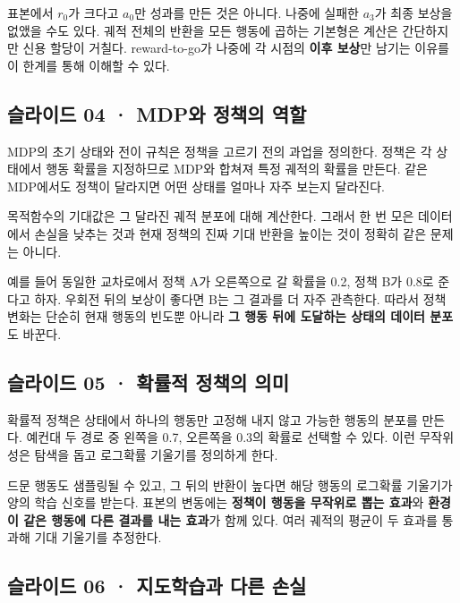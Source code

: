 \documentclass[11pt,a4paper]{article}
\begin{document}
표본에서 $r_0$가 크다고 $a_0$만 성과를 만든 것은 아니다. 나중에 실패한 $a_3$가 최종 보상을 없앴을 수도 있다. 궤적 전체의 반환을 모든 행동에 곱하는 기본형은 계산은 간단하지만 신용 할당이 거칠다. reward-to-go가 나중에 각 시점의 \textbf{이후 보상}만 남기는 이유를 이 한계를 통해 이해할 수 있다.\par

\subsection{슬라이드 04 · MDP와 정책의 역할}

MDP의 초기 상태와 전이 규칙은 정책을 고르기 전의 과업을 정의한다. 정책은 각 상태에서 행동 확률을 지정하므로 MDP와 합쳐져 특정 궤적의 확률을 만든다. 같은 MDP에서도 정책이 달라지면 어떤 상태를 얼마나 자주 보는지 달라진다.\par

목적함수의 기대값은 그 달라진 궤적 분포에 대해 계산한다. 그래서 한 번 모은 데이터에서 손실을 낮추는 것과 현재 정책의 진짜 기대 반환을 높이는 것이 정확히 같은 문제는 아니다.\par

예를 들어 동일한 교차로에서 정책 A가 오른쪽으로 갈 확률을 0.2, 정책 B가 0.8로 준다고 하자. 우회전 뒤의 보상이 좋다면 B는 그 결과를 더 자주 관측한다. 따라서 정책 변화는 단순히 현재 행동의 빈도뿐 아니라 \textbf{그 행동 뒤에 도달하는 상태의 데이터 분포}도 바꾼다.\par

\subsection{슬라이드 05 · 확률적 정책의 의미}

확률적 정책은 상태에서 하나의 행동만 고정해 내지 않고 가능한 행동의 분포를 만든다. 예컨대 두 경로 중 왼쪽을 0.7, 오른쪽을 0.3의 확률로 선택할 수 있다. 이런 무작위성은 탐색을 돕고 로그확률 기울기를 정의하게 한다.\par

드문 행동도 샘플링될 수 있고, 그 뒤의 반환이 높다면 해당 행동의 로그확률 기울기가 양의 학습 신호를 받는다. 표본의 변동에는 \textbf{정책이 행동을 무작위로 뽑는 효과}와 \textbf{환경이 같은 행동에 다른 결과를 내는 효과}가 함께 있다. 여러 궤적의 평균이 두 효과를 통과해 기대 기울기를 추정한다.\par

\subsection{슬라이드 06 · 지도학습과 다른 손실}
\end{document}
